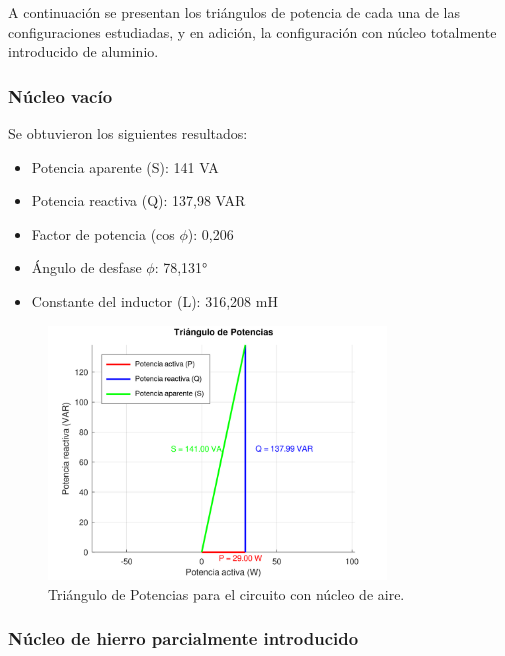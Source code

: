 \documentclass{article}
\begin{document}
                    A continuación se presentan los triángulos de potencia de cada una de las configuraciones estudiadas, y en adición,
                    la configuración con núcleo totalmente introducido de aluminio. 

                    \subsubsection{Núcleo vacío}
                        Se obtuvieron los siguientes resultados:
                        \begin{itemize}
                            \item Potencia aparente (S): 141 VA
                            \item Potencia reactiva (Q): 137,98 VAR
                            \item Factor de potencia (cos $\phi$): 0,206
                            \item Ángulo de desfase $\phi$: 78,131°
                            \item Constante del inductor (L): 316,208 mH
                        \end{itemize}

                        \begin{figure}[H]
                            \centering
                            \includegraphics[width=0.8\textwidth]{graficoAire.png}
                            \caption{Triángulo de Potencias para el circuito con núcleo de aire.}
                            \label{fig:graficoAire}
                        \end{figure}
                    
                    \subsubsection{Núcleo de hierro parcialmente introducido}
                        
\end{document}
